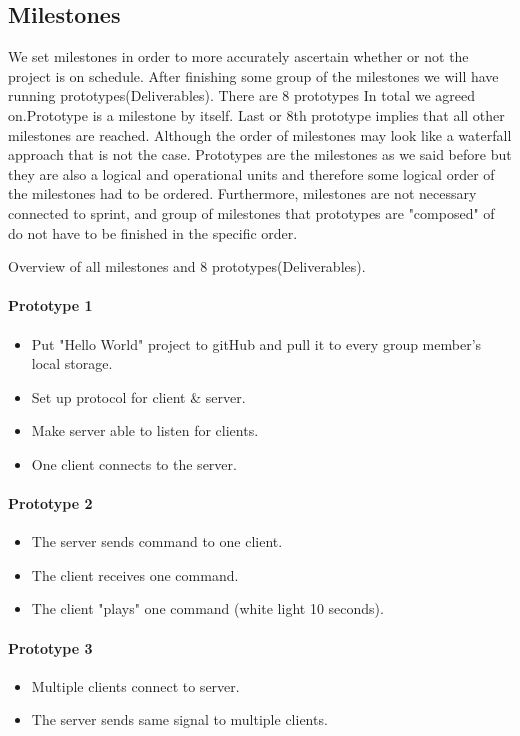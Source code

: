 \documentclass{article}
\begin{document}
\subsection{Milestones}

We set milestones in order to more accurately ascertain whether or not the project is on schedule. After finishing some group of the milestones we will have running prototypes(Deliverables). There are 8 prototypes In total we 
agreed on.Prototype is a milestone by itself. Last or 8th prototype implies that all other milestones are reached. Although the order of milestones may look like a waterfall approach that is not the case.
Prototypes are the milestones as we said before but they are also a logical and operational units and therefore some logical order of the milestones had to be ordered. Furthermore, milestones are not 
necessary connected to sprint, and group of milestones that prototypes are "composed" of do not have to be finished in the specific order.


Overview of all milestones and 8 prototypes(Deliverables).

\paragraph{Prototype 1}
\begin{itemize}
	\item Put "Hello World" project to gitHub and pull it to every group member's local storage.
	\item Set up protocol for client \& server.
	\item Make server able to listen for clients.
	\item One client connects to the server.
\end{itemize}

\paragraph{Prototype 2}
\begin{itemize}
	\item The server sends command to one client.
	\item The client receives one command.
	\item The client "plays" one command (white light 10 seconds).
\end{itemize}

\paragraph{Prototype 3}
\begin{itemize}
	\item Multiple clients connect to server.
	\item The server sends same signal to multiple clients.
\end{itemize}
\end{document}
